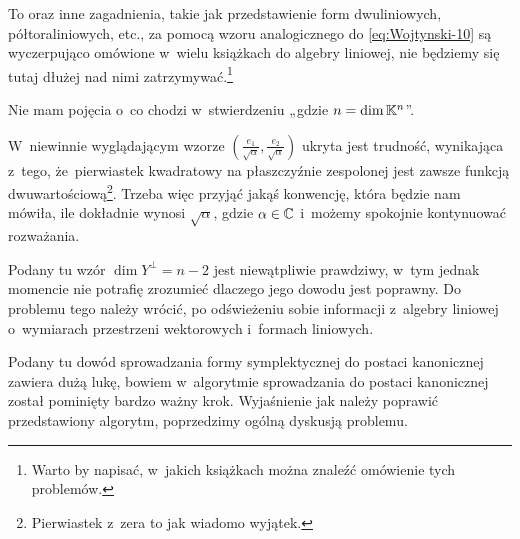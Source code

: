 \documentclass[a4paper,11pt]{article}
\begin{document}
To oraz inne zagadnienia, takie jak przedstawienie form dwuliniowych,
półtoraliniowych, etc., za pomocą wzoru analogicznego do
\eqref{eq:Wojtynski-10} są wyczerpująco omówione w~wielu książkach do
algebry liniowej, nie będziemy się tutaj dłużej nad nimi
zatrzymywać.\footnote{Warto by napisać, w~jakich książkach można znaleźć
  omówienie tych problemów.}

\vspace{\spaceFour}




 Nie mam pojęcia o~co chodzi w~stwierdzeniu
„gdzie $n = \dim \mathbb{K}^{ n }$”.

\vspace{\spaceFour}





 W~niewinnie wyglądającym wzorze $\left(
  \frac{ e_{ 1 } }{ \sqrt{ \alpha } }, \frac{ e_{ 2 } }{ \sqrt{ \alpha } } \right)$
ukryta jest trudność, wynikająca z~tego, że~pierwiastek kwadratowy na
płaszczyźnie zespolonej jest zawsze funkcją
dwuwartościową\footnote{Pierwiastek z~zera to jak wiadomo wyjątek.}.
Trzeba więc przyjąć jakąś konwencję, która będzie nam mówiła, ile dokładnie
wynosi $\sqrt{ \alpha }$, gdzie $\alpha \in \mathbb{C}$ i~możemy spokojnie kontynuować
rozważania.

\vspace{\spaceFour}





 Podany tu wzór $\dim Y^{ \perp } = n - 2$ jest niewątpliwie
prawdziwy, w~tym jednak momencie nie potrafię zrozumieć dlaczego jego
dowodu jest poprawny. Do problemu tego należy wrócić, po odświeżeniu sobie
informacji z~algebry liniowej o~wymiarach przestrzeni wektorowych i~formach
liniowych.

\vspace{\spaceFour}



 Podany tu dowód sprowadzania formy symplektycznej do
postaci kanonicznej zawiera dużą lukę, bowiem w~algorytmie sprowadzania do
postaci kanonicznej został pominięty bardzo ważny krok. Wyjaśnienie jak
należy poprawić przedstawiony algorytm, poprzedzimy ogólną dyskusją
problemu.
\end{document}
